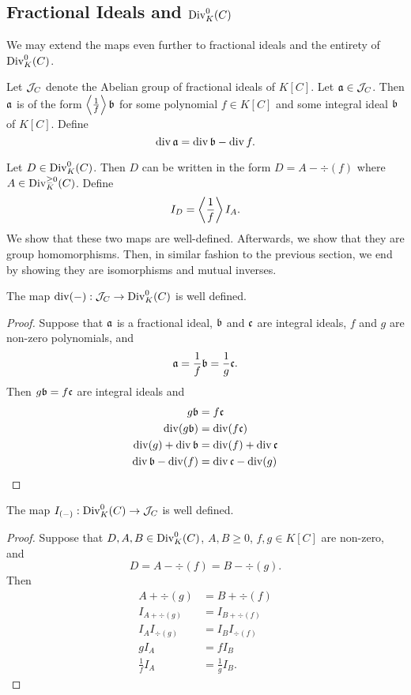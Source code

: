 
\subsection{Fractional Ideals and $\Div_K^0(C)$}

We may extend the maps even further to fractional ideals and the entirety of $\Div_K^0(C)$.

Let $\cal J_C$ denote the Abelian group of fractional ideals of $K[C]$.
Let $\frak a \in \cal J_C$.
Then $\frak a$ is of the form $\pid{\frac 1 f} \frak b$ for some polynomial $f \in K[C]$ and some integral ideal $\frak b$ of $K[C]$.
Define
\[ \div \frak a = \div \frak b - \div f. \]

Let $D \in \Div_K^0(C)$.
Then $D$ can be written in the form $D = A - \div(f)$ where $A \in \Div_K^{\geq 0}(C)$.
Define
\[ I_D = \pid{\frac 1 f} I_A. \]
We show that these two maps are well-defined.
Afterwards, we show that they are group homomorphisms.
Then, in similar fashion to the previous section, we end by showing they are isomorphisms and mutual inverses.

\begin{proposition}
  The map $\div(-) : \cal J_C \to \Div_K^0(C)$ is well defined.
\end{proposition}
\begin{proof}
  Suppose that $\frak a$ is a fractional ideal,
  $\frak b$ and $\frak c$ are integral ideals,
  $f$ and $g$ are non-zero polynomials, and
    \[ \frak a = \frac 1 f \frak b = \frac 1 g \frak c. \]
  Then $g \frak b = f \frak c$ are integral ideals and
  \begin{align*}
    g \frak b &= f \frak c \\
    \div(g \frak b) &= \div(f \frak c) \\
    \div(g) + \div \frak b &= \div(f) + \div \frak c \\
    \div \frak b - \div(f) &= \div \frak c - \div(g)
  \end{align*}
\end{proof}

\begin{proposition}
  The map $I_{(-)} : \Div_K^0(C) \to \cal J_C$ is well defined.
\end{proposition}
\begin{proof}
  Suppose that $D, A, B \in \Div_K^0(C)$, $A, B \geq 0$,
  $f, g \in K[C]$ are non-zero, and
    \[ D = A - \div(f) = B - \div(g). \]
  Then
  \begin{align*}
    A + \div(g) &= B + \div(f) \\
    I_{A + \div(g)} &= I_{B + \div(f)} \\
    I_A I_{\div(g)} &= I_B I_{\div(f)} \\
    g I_A &= f I_B \\
    \frac 1 f I_A &= \frac 1 g I_B.
  \end{align*}
\end{proof}


